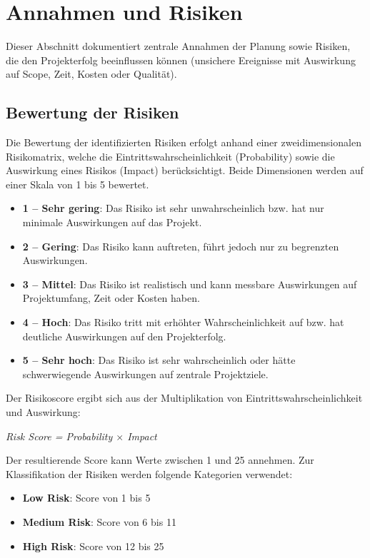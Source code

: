 
\chapter{Annahmen und Risiken}

Dieser Abschnitt dokumentiert zentrale Annahmen der Planung sowie Risiken, die
den Projekterfolg beeinflussen können (unsichere Ereignisse mit Auswirkung auf
Scope, Zeit, Kosten oder Qualität).

\section{Bewertung der Risiken}

Die Bewertung der identifizierten Risiken erfolgt anhand einer
zweidimensionalen Risikomatrix, welche die Eintrittswahrscheinlichkeit
(Probability) sowie die Auswirkung eines Risikos (Impact) berücksichtigt.
Beide Dimensionen werden auf einer Skala von 1 bis 5 bewertet.

\begin{itemize}
    \item \textbf{1 -- Sehr gering}: Das Risiko ist sehr unwahrscheinlich bzw. hat nur minimale Auswirkungen auf das Projekt.
    \item \textbf{2 -- Gering}: Das Risiko kann auftreten, führt jedoch nur zu begrenzten Auswirkungen.
    \item \textbf{3 -- Mittel}: Das Risiko ist realistisch und kann messbare Auswirkungen auf Projektumfang, Zeit oder Kosten haben.
    \item \textbf{4 -- Hoch}: Das Risiko tritt mit erhöhter Wahrscheinlichkeit auf bzw. hat deutliche Auswirkungen auf den Projekterfolg.
    \item \textbf{5 -- Sehr hoch}: Das Risiko ist sehr wahrscheinlich oder hätte schwerwiegende Auswirkungen auf zentrale Projektziele.
\end{itemize}

Der Risikoscore ergibt sich aus der Multiplikation von
Eintrittswahrscheinlichkeit und Auswirkung:

\begin{center}
    \textit{Risk Score = Probability $\times$ Impact}
\end{center}

Der resultierende Score kann Werte zwischen 1 und 25 annehmen.
Zur Klassifikation der Risiken werden folgende Kategorien verwendet:

\begin{itemize}
    \item \textbf{Low Risk}: Score von 1 bis 5
    \item \textbf{Medium Risk}: Score von 6 bis 11
    \item \textbf{High Risk}: Score von 12 bis 25
\end{itemize}

